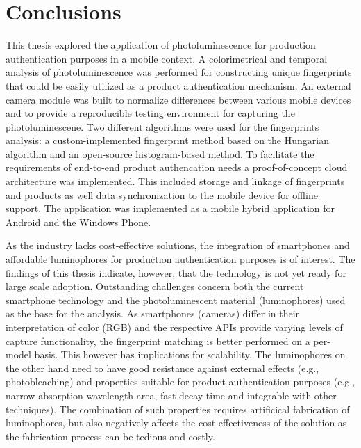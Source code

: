 \documentclass[thesis.tex]{subfiles}
\begin{document}
\chapter{Conclusions}
\label{chapter:conclusions}

This thesis explored the application of photoluminescence for production authentication purposes in a mobile context. A colorimetrical and temporal analysis of photoluminescence was performed for constructing unique fingerprints that could be easily utilized as a product authentication mechanism. An external camera module was built to normalize differences between various mobile devices and to provide a reproducible testing environment for capturing the photoluminescene. Two different algorithms were used for the fingerprints analysis: a custom-implemented fingerprint method based on the Hungarian algorithm and an open-source histogram-based method. To facilitate the requirements of end-to-end product authencation needs a proof-of-concept cloud architecture was implemented. This included storage and linkage of fingerprints and products as well data synchronization to the mobile device for offline support. The application was implemented as a mobile hybrid application for Android and the Windows Phone.

As the industry lacks cost-effective solutions, the integration of smartphones and affordable luminophores for production authentication purposes is of interest. The findings of this thesis indicate, however, that the technology is not yet ready for large scale adoption. Outstanding challenges concern both the current smartphone technology and the photoluminescent material (luminophores) used as the base for the analysis. As smartphones (cameras) differ in their interpretation of color (RGB) and the respective APIs provide varying levels of capture functionality, the fingerprint matching is better performed on a per-model basis. This however has implications for scalability. The luminophores on the other hand need to have good resistance against external effects (e.g., photobleaching) and properties suitable for product authentication purposes (e.g., narrow absorption wavelength area, fast decay time and integrable with other techniques). The combination of such properties requires artificical fabrication of luminophores, but also negatively affects the cost-effectiveness of the solution as the fabrication process can be tedious and costly.
\end{document}
